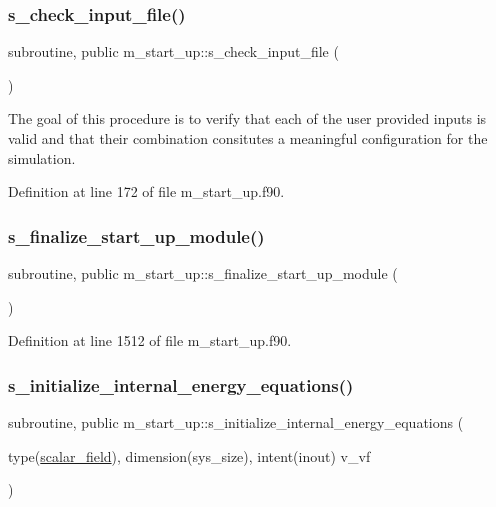 \subsubsection{\texorpdfstring{s\+\_\+check\+\_\+input\+\_\+file()}{s\_check\_input\_file()}}
{\footnotesize\ttfamily subroutine, public m\+\_\+start\+\_\+up\+::s\+\_\+check\+\_\+input\+\_\+file (\begin{DoxyParamCaption}{ }\end{DoxyParamCaption})}



The goal of this procedure is to verify that each of the user provided inputs is valid and that their combination consitutes a meaningful configuration for the simulation. 



Definition at line 172 of file m\+\_\+start\+\_\+up.\+f90.

\mbox{\label{namespacem__start__up_a65fd279db64882a3732a0549ec74e335}} 
\subsubsection{\texorpdfstring{s\+\_\+finalize\+\_\+start\+\_\+up\+\_\+module()}{s\_finalize\_start\_up\_module()}}
{\footnotesize\ttfamily subroutine, public m\+\_\+start\+\_\+up\+::s\+\_\+finalize\+\_\+start\+\_\+up\+\_\+module (\begin{DoxyParamCaption}{ }\end{DoxyParamCaption})}



Definition at line 1512 of file m\+\_\+start\+\_\+up.\+f90.

\mbox{\label{namespacem__start__up_a38182f7fcc92c1c687840339a20e85cd}} 
\subsubsection{\texorpdfstring{s\+\_\+initialize\+\_\+internal\+\_\+energy\+\_\+equations()}{s\_initialize\_internal\_energy\_equations()}}
{\footnotesize\ttfamily subroutine, public m\+\_\+start\+\_\+up\+::s\+\_\+initialize\+\_\+internal\+\_\+energy\+\_\+equations (\begin{DoxyParamCaption}\item[{type(\hyperlink{structm__derived__types_1_1scalar__field}{scalar\+\_\+field}), dimension(sys\+\_\+size), intent(inout)}]{v\+\_\+vf }\end{DoxyParamCaption})}



